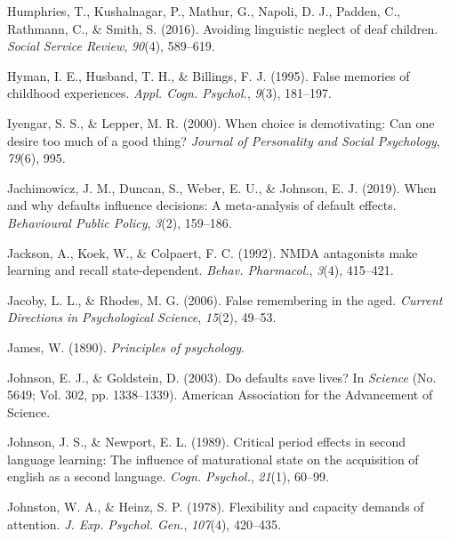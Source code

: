 \documentclass[
]{krantz}
\newlength{\cslhangindent}
\newlength{\cslentryspacingunit} %
\newenvironment{CSLReferences}[2] %
 {%
  \setlength{\parindent}{0pt}
  \ifodd #1
  \let\oldpar\par
  \def\par{\hangindent=\cslhangindent\oldpar}
  \fi
  \setlength{\parskip}{#2\cslentryspacingunit}
 }%
 {}
\begin{document}
\begin{CSLReferences}{1}{0}
\leavevmode{}%
Humphries, T., Kushalnagar, P., Mathur, G., Napoli, D. J., Padden, C., Rathmann, C., \& Smith, S. (2016). Avoiding linguistic neglect of deaf children. \emph{Social Service Review}, \emph{90}(4), 589--619.

\leavevmode{}%
Hyman, I. E., Husband, T. H., \& Billings, F. J. (1995). False memories of childhood experiences. \emph{Appl. Cogn. Psychol.}, \emph{9}(3), 181--197.

\leavevmode{}%
Iyengar, S. S., \& Lepper, M. R. (2000). When choice is demotivating: Can one desire too much of a good thing? \emph{Journal of Personality and Social Psychology}, \emph{79}(6), 995.

\leavevmode{}%
Jachimowicz, J. M., Duncan, S., Weber, E. U., \& Johnson, E. J. (2019). When and why defaults influence decisions: A meta-analysis of default effects. \emph{Behavioural Public Policy}, \emph{3}(2), 159--186.

\leavevmode{}%
Jackson, A., Koek, W., \& Colpaert, F. C. (1992). {NMDA} antagonists make learning and recall state-dependent. \emph{Behav. Pharmacol.}, \emph{3}(4), 415--421.

\leavevmode{}%
Jacoby, L. L., \& Rhodes, M. G. (2006). False remembering in the aged. \emph{Current Directions in Psychological Science}, \emph{15}(2), 49--53.

\leavevmode{}%
James, W. (1890). \emph{Principles of psychology}.

\leavevmode{}%
Johnson, E. J., \& Goldstein, D. (2003). Do defaults save lives? In \emph{Science} (No. 5649; Vol. 302, pp. 1338--1339). American Association for the Advancement of Science.

\leavevmode{}%
Johnson, J. S., \& Newport, E. L. (1989). Critical period effects in second language learning: The influence of maturational state on the acquisition of english as a second language. \emph{Cogn. Psychol.}, \emph{21}(1), 60--99.

\leavevmode{}%
Johnston, W. A., \& Heinz, S. P. (1978). Flexibility and capacity demands of attention. \emph{J. Exp. Psychol. Gen.}, \emph{107}(4), 420--435.


\end{CSLReferences}
\end{document}

